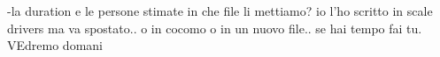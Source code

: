 
-la duration e le persone stimate in che file li mettiamo? io l'ho scritto in scale drivers ma va spostato.. o in cocomo o in un nuovo file.. se hai tempo fai tu. VEdremo domani